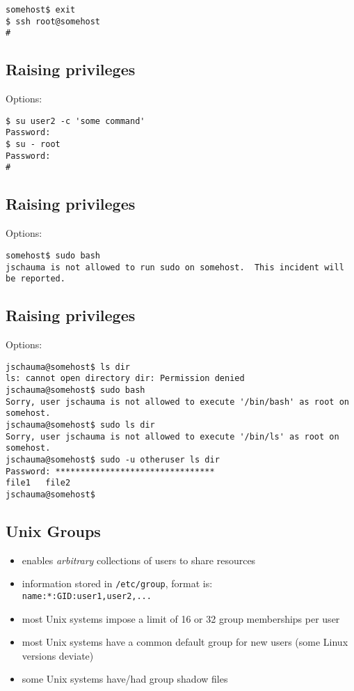 \documentclass[xga]{xdvislides}
\begin{document}
\begin{verbatim}
somehost$ exit
$ ssh root@somehost
# 
\end{verbatim}

\subsection{Raising privileges}
Options:

\begin{verbatim}
$ su user2 -c 'some command'
Password:
$ su - root
Password:
# 
\end{verbatim}

\subsection{Raising privileges}
Options:

\begin{verbatim}
somehost$ sudo bash
jschauma is not allowed to run sudo on somehost.  This incident will be reported.
\end{verbatim}

\subsection{Raising privileges}
Options:

\begin{verbatim}
jschauma@somehost$ ls dir
ls: cannot open directory dir: Permission denied
jschauma@somehost$ sudo bash
Sorry, user jschauma is not allowed to execute '/bin/bash' as root on somehost.
jschauma@somehost$ sudo ls dir
Sorry, user jschauma is not allowed to execute '/bin/ls' as root on somehost.
jschauma@somehost$ sudo -u otheruser ls dir
Password: ********************************
file1   file2
jschauma@somehost$ 
\end{verbatim}

\subsection{Unix Groups}
\begin{itemize}
	\item enables {\em arbitrary} collections of users to share resources
	\item information stored in \verb+/etc/group+, format is: \\
		\verb+name:*:GID:user1,user2,...+
	\item most Unix systems impose a limit of 16 or 32 group memberships per
		user
	\item most Unix systems have a common default group for new users (some
		Linux versions deviate)
	\item some Unix systems have/had group shadow files
\end{itemize}
\end{document}
